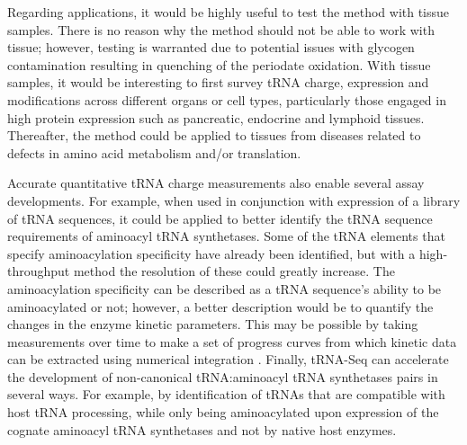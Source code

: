 Regarding applications, it would be highly useful to test the method with tissue samples.
There is no reason why the method should not be able to work with tissue; however, testing is warranted due to potential issues with glycogen contamination resulting in quenching of the periodate oxidation.
With tissue samples, it would be interesting to first survey tRNA charge, expression and modifications across different organs or cell types, particularly those engaged in high protein expression such as pancreatic, endocrine and lymphoid tissues.
Thereafter, the method could be applied to tissues from diseases related to defects in amino acid metabolism and/or translation.

Accurate quantitative tRNA charge measurements also enable several assay developments.
For example, when used in conjunction with expression of a library of tRNA sequences, it could be applied to better identify the tRNA sequence requirements of aminoacyl tRNA synthetases.
Some of the tRNA elements that specify aminoacylation specificity have already been identified, but with a high-throughput method the resolution of these could greatly increase.
The aminoacylation specificity can be described as a tRNA sequence's ability to be aminoacylated or not; however, a better description would be to quantify the changes in the enzyme kinetic parameters.
This may be possible by taking measurements over time to make a set of progress curves from which kinetic data can be extracted using numerical integration \cite{Johnson2009-cx, Johnson2013-df}.
Finally, tRNA-Seq can accelerate the development of non-canonical tRNA:aminoacyl tRNA synthetases pairs in several ways.
For example, by identification of tRNAs that are compatible with host tRNA processing, while only being aminoacylated upon expression of the cognate aminoacyl tRNA synthetases and not by native host enzymes. 

